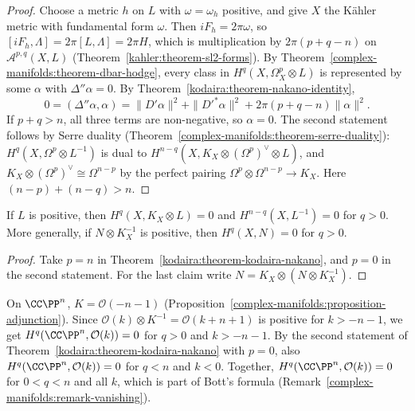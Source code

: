 \begin{proof}
Choose a metric $h$ on $L$ with $\omega = \omega_h$ positive, and give $X$ the K\"ahler metric with fundamental form $\omega$. Then
$iF_h = 2\pi\omega$, so $[iF_h, \Lambda] = 2\pi[L, \Lambda] = 2\pi H$, which is multiplication by $2\pi(p + q - n)$ on $\mathcal{A}^{p,q}(X, L)$
(Theorem~\ref{kahler:theorem-sl2-forms}). By Theorem~\ref{complex-manifolds:theorem-dbar-hodge}, every class in $H^q(X, \Omega^p_X \otimes L)$ is
represented by some $\alpha$ with $\Delta''\alpha = 0$. By Theorem~\ref{kodaira:theorem-nakano-identity},
\[
0 = (\Delta''\alpha, \alpha) = \|D'\alpha\|^2 + \|D'^*\alpha\|^2 + 2\pi(p + q - n)\|\alpha\|^2 .
\]
If $p + q > n$, all three terms are non-negative, so $\alpha = 0$. The second statement follows by Serre duality
(Theorem~\ref{complex-manifolds:theorem-serre-duality}): $H^q(X, \Omega^p \otimes L^{-1})$ is dual to $H^{n-q}(X, K_X \otimes (\Omega^p)^\vee \otimes L)$, and
$K_X \otimes (\Omega^p)^\vee \cong \Omega^{n-p}$ by the perfect pairing $\Omega^p \otimes \Omega^{n-p} \to K_X$. Here $(n - p) + (n - q) > n$.
\end{proof}

\begin{corollary}\label{kodaira:corollary-kodaira-vanishing}
If $L$ is positive, then $H^q(X, K_X \otimes L) = 0$ and $H^{n-q}(X, L^{-1}) = 0$ for $q > 0$. More generally, if $N \otimes K_X^{-1}$ is
positive, then $H^q(X, N) = 0$ for $q > 0$.
\end{corollary}

\begin{proof}
Take $p = n$ in Theorem~\ref{kodaira:theorem-kodaira-nakano}, and $p = 0$ in the second statement. For the last claim write
$N = K_X \otimes (N \otimes K_X^{-1})$.
\end{proof}

\begin{example}\label{kodaira:example-projective-space}
On $\CC\PP^n$, $K = \mathcal{O}(-n-1)$ (Proposition~\ref{complex-manifolds:proposition-adjunction}). Since $\mathcal{O}(k) \otimes K^{-1} = \mathcal{O}(k + n + 1)$
is positive for $k > -n - 1$, we get $H^q(\CC\PP^n, \mathcal{O}(k)) = 0$ for $q > 0$ and $k > -n - 1$. By the second statement of
Theorem~\ref{kodaira:theorem-kodaira-nakano} with $p = 0$, also $H^q(\CC\PP^n, \mathcal{O}(k)) = 0$ for $q < n$ and $k < 0$. Together,
$H^q(\CC\PP^n, \mathcal{O}(k)) = 0$ for $0 < q < n$ and all $k$, which is part of Bott's formula (Remark~\ref{complex-manifolds:remark-vanishing}).
\end{example}

